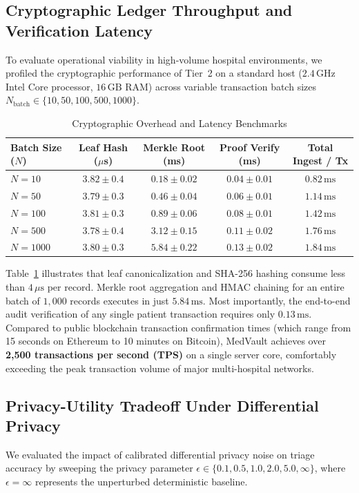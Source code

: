 \documentclass[conference]{IEEEtran}
\begin{document}
\subsection{Cryptographic Ledger Throughput and Verification Latency}
To evaluate operational viability in high-volume hospital environments, we profiled the cryptographic performance of Tier~2 on a standard host ($2.4\,\text{GHz}$ Intel Core processor, $16\,\text{GB}$ RAM) across variable transaction batch sizes $N_{\text{batch}} \in \{10, 50, 100, 500, 1000\}$.

\begin{table}[h]
\centering
\caption{Cryptographic Overhead and Latency Benchmarks}
\label{tab:crypto_benchmarks}
\begin{tabularx}{\columnwidth}{l c c c c}
\toprule
\textbf{Batch Size ($N$)} & \textbf{Leaf Hash ($\mu$s)} & \textbf{Merkle Root (ms)} & \textbf{Proof Verify (ms)} & \textbf{Total Ingest / Tx} \\
\midrule
$N = 10$ & $3.82 \pm 0.4$ & $0.18 \pm 0.02$ & $0.04 \pm 0.01$ & $0.82\,\text{ms}$ \\
$N = 50$ & $3.79 \pm 0.3$ & $0.46 \pm 0.04$ & $0.06 \pm 0.01$ & $1.14\,\text{ms}$ \\
$N = 100$ & $3.81 \pm 0.3$ & $0.89 \pm 0.06$ & $0.08 \pm 0.01$ & $1.42\,\text{ms}$ \\
$N = 500$ & $3.78 \pm 0.4$ & $3.12 \pm 0.15$ & $0.11 \pm 0.02$ & $1.76\,\text{ms}$ \\
$N = 1000$ & $3.80 \pm 0.3$ & $5.84 \pm 0.22$ & $0.13 \pm 0.02$ & $1.84\,\text{ms}$ \\
\bottomrule
\end{tabularx}
\end{table}

Table~\ref{tab:crypto_benchmarks} illustrates that leaf canonicalization and SHA-256 hashing consume less than $4\,\mu\text{s}$ per record. Merkle root aggregation and HMAC chaining for an entire batch of $1,000$ records executes in just $5.84\,\text{ms}$. Most importantly, the end-to-end audit verification of any single patient transaction requires only $0.13\,\text{ms}$. Compared to public blockchain transaction confirmation times (which range from 15 seconds on Ethereum to 10 minutes on Bitcoin), MedVault achieves over \textbf{2,500 transactions per second (TPS)} on a single server core, comfortably exceeding the peak transaction volume of major multi-hospital networks.

\subsection{Privacy-Utility Tradeoff Under Differential Privacy}
We evaluated the impact of calibrated differential privacy noise on triage accuracy by sweeping the privacy parameter $\epsilon \in \{0.1, 0.5, 1.0, 2.0, 5.0, \infty\}$, where $\epsilon = \infty$ represents the unperturbed deterministic baseline.
\end{document}
